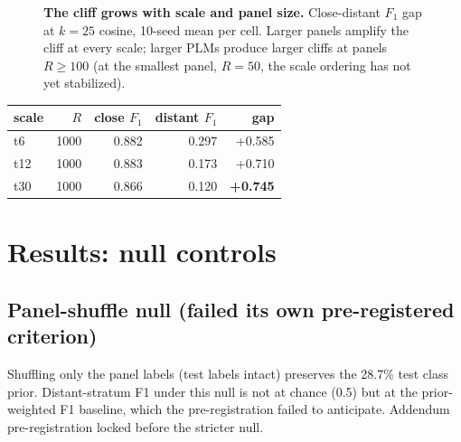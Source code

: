 \documentclass[11pt]{article}
\begin{document}
\begin{figure}[h]\centering
{}
\caption{\textbf{The cliff grows with scale and panel size.} Close-distant $F_1$ gap at $k=25$ cosine, 10-seed mean per cell. Larger panels amplify the cliff at every scale; larger PLMs produce larger cliffs at panels $R\geq100$ (at the smallest panel, $R=50$, the scale ordering has not yet stabilized).}\label{fig:cliff_surface}
\end{figure}

\begin{center}\small
\begin{tabular}{lrrrr}
\toprule
scale & $R$ & close $F_1$ & distant $F_1$ & gap \\
\midrule
t6 & 1000 & 0.882 & 0.297 & +0.585 \\
t12 & 1000 & 0.883 & 0.173 & +0.710 \\
t30 & 1000 & 0.866 & 0.120 & \textbf{+0.745} \\
\bottomrule
\end{tabular}
\end{center}


\section{Results: null controls}
\subsection{Panel-shuffle null (failed its own pre-registered criterion)}
Shuffling only the panel labels (test labels intact) preserves the 28.7\% test class prior. Distant-stratum F1 under this null is not at chance (0.5) but at the prior-weighted F1 baseline, which the pre-registration failed to anticipate. Addendum pre-registration locked before the stricter null.
\end{document}

